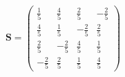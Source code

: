 \[ \mathbf{S} = \left(\begin{array}{cccc}  \frac{ 1 }{5}  &  \frac{ 4
}{ 5 }  &  \frac{ 2 }{ 5 }  &  -\frac{ 2 }{ 5 }  \\  \frac{ 4 }{ 5 }
&  \frac{ 1 }{5}  &  -\frac{ 2 }{ 5 }  &  \frac{ 2 }{ 5 }  \\  \frac{
2 }{ 5 }  &  -\frac{ 2 }{ 5 }  &  \frac{ 4 }{ 5 }  &  \frac{ 1 }{5}
\\  -\frac{ 2 }{ 5 }  &  \frac{ 2 }{ 5 }  &  \frac{ 1 }{5}  &  \frac{
4 }{ 5 }  \end{array}\right) \]
